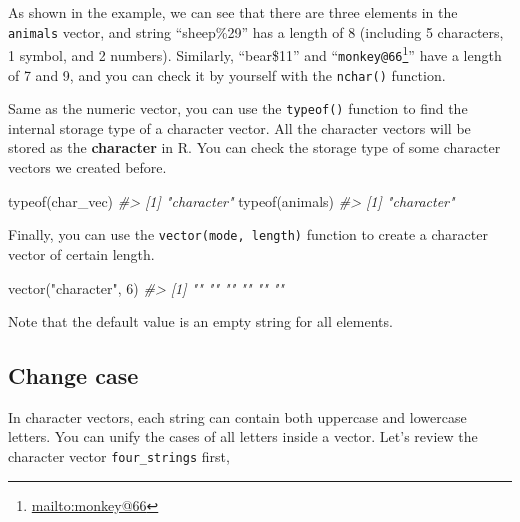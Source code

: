 \documentclass[
]{book}
\newenvironment{Shaded}{\begin{snugshade}}{\end{snugshade}}
\newcommand{\CommentTok}[1]{\textcolor[rgb]{0.56,0.35,0.01}{\textit{#1}}}
\newcommand{\DecValTok}[1]{\textcolor[rgb]{0.00,0.00,0.81}{#1}}
\newcommand{\FunctionTok}[1]{\textcolor[rgb]{0.00,0.00,0.00}{#1}}
\newcommand{\NormalTok}[1]{#1}
\newcommand{\OtherTok}[1]{\textcolor[rgb]{0.56,0.35,0.01}{#1}}
\newcommand{\StringTok}[1]{\textcolor[rgb]{0.31,0.60,0.02}{#1}}
\renewcommand{\href}[2]{#2\footnote{\url{#1}}}
\begin{document}
As shown in the example, we can see that there are three elements in the \texttt{animals} vector, and string ``sheep\%29'' has a length of 8 (including 5 characters, 1 symbol, and 2 numbers). Similarly, ``bear\$11'' and ``\href{mailto:monkey@66}{\nolinkurl{monkey@66}}'' have a length of 7 and 9, and you can check it by yourself with the \texttt{nchar()} function.

Same as the numeric vector, you can use the \texttt{typeof()} function to find the internal storage type of a character vector. All the character vectors will be stored as the \textbf{character} in R. You can check the storage type of some character vectors we created before.

\begin{Shaded}
\begin{Highlighting}[]
\FunctionTok{typeof}\NormalTok{(char\_vec)}
\CommentTok{\#\textgreater{} [1] "character"}
\FunctionTok{typeof}\NormalTok{(animals)}
\CommentTok{\#\textgreater{} [1] "character"}
\end{Highlighting}
\end{Shaded}

Finally, you can use the \texttt{vector(mode,\ length)} function to create a character vector of certain length.

\begin{Shaded}
\begin{Highlighting}[]
\FunctionTok{vector}\NormalTok{(}\StringTok{"character"}\NormalTok{, }\DecValTok{6}\NormalTok{)}
\CommentTok{\#\textgreater{} [1] "" "" "" "" "" ""}
\end{Highlighting}
\end{Shaded}

Note that the default value is an empty string for all elements.

\hypertarget{case}{%
\subsection{Change case}\label{case}}

In character vectors, each string can contain both uppercase and lowercase letters. You can unify the cases of all letters inside a vector. Let's review the character vector \texttt{four\_strings} first,

\begin{Shaded}
\end{Shaded}
\end{document}
